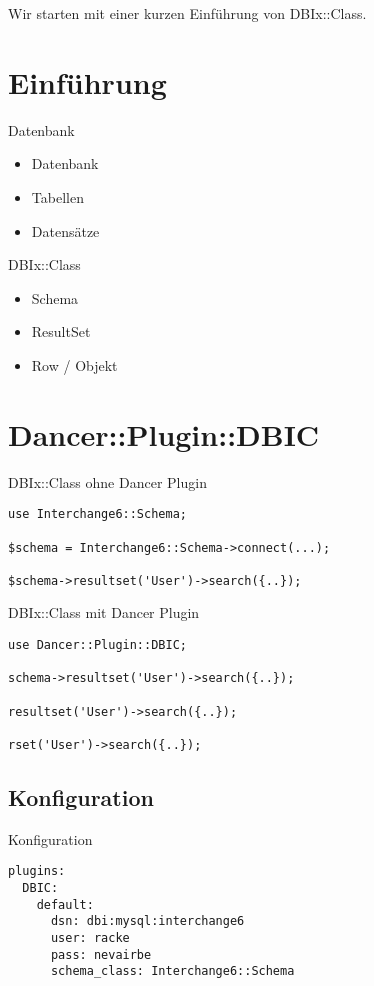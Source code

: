 Wir starten mit einer kurzen Einführung von DBIx::Class.

\section{Einführung}
\begin{frame}{Datenbank}
\begin{itemize}
\item Datenbank
\item Tabellen
\item Datensätze
\end{itemize}
\end{frame}

\begin{frame}{DBIx::Class}
\begin{itemize}
\item Schema
\item ResultSet
\item Row / Objekt
\end{itemize}
\end{frame}

\section{Dancer::Plugin::DBIC}
\begin{frame}[fragile]{DBIx::Class ohne Dancer Plugin}
\begin{lstlisting}
use Interchange6::Schema;

$schema = Interchange6::Schema->connect(...);

$schema->resultset('User')->search({..});
\end{lstlisting}
\end{frame}

\begin{frame}[fragile]{DBIx::Class mit Dancer Plugin}
\begin{lstlisting}
use Dancer::Plugin::DBIC;

schema->resultset('User')->search({..});

resultset('User')->search({..});

rset('User')->search({..});
\end{lstlisting}
\end{frame}

\subsection{Konfiguration}
\begin{frame}[fragile]{Konfiguration}
\begin{lstlisting}
plugins:
  DBIC:
    default:
      dsn: dbi:mysql:interchange6
      user: racke
      pass: nevairbe
      schema_class: Interchange6::Schema
\end{lstlisting}
\end{frame}

